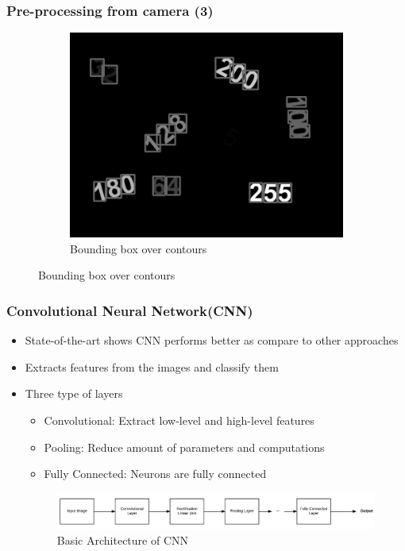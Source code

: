 \documentclass[11.5pt,aspectratio=1610,xcolor={usenames,dvipsnames,table}]{beamer}
\begin{document}
\begin{frame}
\frametitle{Pre-processing from camera (3)}
	\begin{figure}[H]
	\begin{subfigure}{0.45\textwidth}
	\includegraphics[width=1 \textwidth]{images/bbox.png}
	\caption{Bounding box over contours}
	\end{subfigure}
	
	\end{figure}
\end{frame}
\begin{frame}

\frametitle{Convolutional Neural Network(CNN)}

\begin{itemize}
	\item State-of-the-art shows CNN performs better as compare to other approaches\cite{cnn}
	\item Extracts features from the images and classify them
	\item Three type of layers
		\begin{itemize}
			\item Convolutional: Extract low-level and high-level features
			\item Pooling: Reduce amount of parameters and computations
			\item Fully Connected: Neurons are fully connected
		\end{itemize}	
	\begin{figure}[!h]
		\includegraphics[width=\textwidth]{images/cnn.png}
		\caption{Basic Architecture of CNN }
		
	\end{figure}

\end{itemize}
\end{frame}
\end{document}
